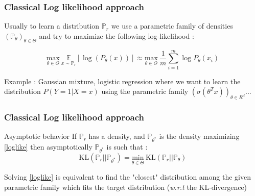 \documentclass[french,9pt]{beamer}
\begin{document}

\begin{frame}
\frametitle{Classical Log likelihood approach}

Usually to learn a distribution $\mathbb{P}_{r}$ we use a parametric family of densities $(\mathbb{P}_{\theta})_{\theta \in \Theta}$ and try to maximize the following log-likelihood  :

\begin{equation}
\label{loglike}
 \underset{\theta \in \Theta}{\text{max}} \ \underset{x \sim \mathbb{P}_{r} }{\mathbb{E}}[\log(P_{\theta}(x))] \approx \underset{\theta \in \Theta}{\text{max}} \ \frac{1}{m} \sum_{i=1}^{m} \log P_{\theta}(x_{i})
 \end{equation}

Example : Gaussian mixture, logistic regression where we want to learn the distribution $P(Y=1|X=x)$ using the parametric family $(\sigma(\theta^{T} x))_{\theta \in R^{d}}$...

\begin{center}
\end{center}

\end{frame}

\begin{frame}
\frametitle{Classical Log likelihood approach}

\begin{block}{Asymptotic behavior}
If $\mathbb{P}_{r}$ has a density, and $\mathbb{P}_{\theta^{*}}$ is the density maximizing \eqref{loglike} then asymptotically $\mathbb{P}_{\theta^{*}}$ is such that : 
$$\text{KL}(\mathbb{P}_{r}||\mathbb{P}_{\theta^{*}})= \underset{\theta \in \Theta}{\text{min}} \ \text{KL}(\mathbb{P}_{r}||\mathbb{P}_{\theta})$$

Solving \eqref{loglike} is equivalent to find the "closest" distribution among the given parametric family which fits the target distribution (\textit{w.r.t} the KL-divergence)
\end{block}


\end{frame}
\end{document}
